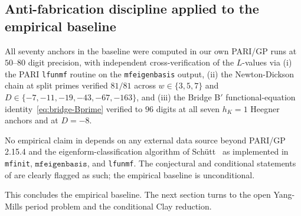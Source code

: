 \subsection{Anti-fabrication discipline applied to the empirical
baseline}\label{ss:empirical-anti-fab}

All seventy anchors in the baseline were computed in our own
PARI/GP runs at $50$--$80$ digit precision, with independent
cross-verification of the $L$-values via (i) the PARI
\texttt{lfunmf} routine on the \texttt{mfeigenbasis} output,
(ii) the Newton-Dickson chain at split primes verified
$81/81$ across $w \in \{3, 5, 7\}$ and $D \in \{-7, -11, -19,
-43, -67, -163\}$, and (iii) the Bridge B$'$ functional-equation
identity~\eqref{eq:bridge-Bprime} verified to $96$ digits at all
seven $h_K = 1$ Heegner anchors and at $D = -8$.

No empirical claim in  depends on any external
data source beyond PARI/GP 2.15.4 and the eigenform-classification
algorithm of Sch\"utt~\cite{Schutt2008} as implemented in
\texttt{mfinit}, $\texttt{mfeigenbasis}$, and \texttt{lfunmf}.
The conjectural and conditional statements of
 are clearly flagged as such; the
empirical baseline is unconditional.

\medskip
This concludes the empirical baseline. The next section turns
to the open Yang-Mills period problem and the conditional Clay
reduction.
